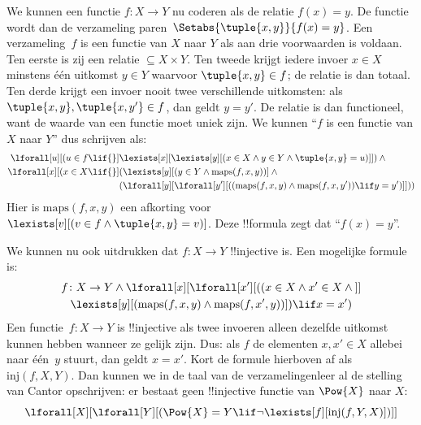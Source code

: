 \documentclass[openany]{memoir}
\begin{document}
We kunnen een functie $f \colon X \to Y$ nu coderen als de relatie
$f(x) = y$. De functie wordt dan de verzameling
paren~$\Setabs{\tuple{x,y}}{f(x) = y}$. Een verzameling~$f$ is een
functie van $X$ naar $Y$ als aan drie voorwaarden is voldaan. Ten eerste
is zij een relatie $\subseteq X \times Y$. Ten tweede krijgt iedere
invoer $x \in X$ minstens één uitkomst $y \in Y$ waarvoor
$\tuple{x, y} \in f$; de relatie is dan totaal. Ten derde krijgt
een invoer nooit twee verschillende uitkomsten: als $\tuple{x, y},
\tuple{x, y'} \in f$, dan geldt $y = y'$. De relatie is dan
functioneel, want de waarde van een functie moet uniek zijn. We
kunnen ``$f$ is een functie van $X$ naar $Y$'' dus schrijven als:
\begin{align*}
 \lforall[u][(u \in f \lif {}] & \lexists[x][\lexists[y][(x \in X \land y \in
      Y \land \tuple{x, y} = u)]]) \land {}\\
 \lforall[x][(x \in X \lif {}] &
      (\lexists[y][(y \in Y \land \mathrm{maps}(f, x, y))] \land {}\\
& (\lforall[y][\lforall[y'][((\mathrm{maps}(f, x, y) \land
    \mathrm{maps}(f, x, y')) \lif y = y')]]))
\end{align*}
Hier is $\mathrm{maps}(f, x, y)$ een afkorting voor
$\lexists[v][(v \in f \land \tuple{x, y} = v)]$. Deze !!{formula}
zegt dat ``$f(x) = y$''.

We kunnen nu ook uitdrukken dat $f\colon X \to Y$ !!{injective} is.
Een mogelijke formule is:
\begin{multline*}
 f \colon X \to Y \land \lforall[x][\lforall[x'][((x \in X \land x' \in
     X \land {}]] \\
 \lexists[y][(\mathrm{maps}(f, x, y) \land \mathrm{maps}(f,
        x', y))]) \lif x = x')
\end{multline*}
Een functie~$f\colon X \to Y$ is !!{injective} als twee invoeren alleen
dezelfde uitkomst kunnen hebben wanneer ze gelijk zijn. Dus: als $f$
de elementen $x, x' \in X$ allebei naar één~$y$ stuurt, dan geldt $x =
x'$. Kort de formule hierboven af als $\mathrm{inj}(f, X, Y)$. Dan
kunnen we in de taal van de verzamelingenleer al de stelling van Cantor
opschrijven: er bestaat geen !!{injective} functie van $\Pow{X}$ naar
$X$:
\[
\lforall[X][\lforall[Y][(\Pow{X} = Y \lif
    \lnot\lexists[f][\mathrm{inj}(f, Y, X)])]]
\]
\end{document}
